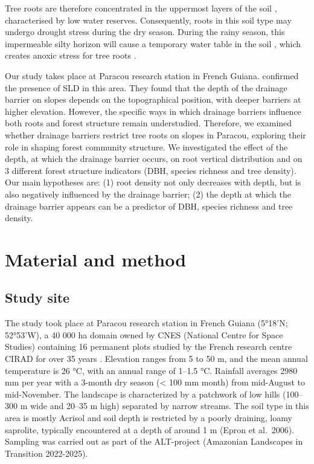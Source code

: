 \documentclass[fleqn,12pt]{latex/stylish_article} %
\begin{document}
Tree roots are therefore concentrated in the uppermost layers of the soil \citep{humbelCaracterisationParMesures1978}, characterised by low water reserves. Consequently, roots in this soil type may undergo drought stress during the dry season. During the rainy season, this impermeable silty horizon will cause a temporary water table in the soil \citep{humbelCaracterisationParMesures1978, pelissierWithinplotRelationshipsTree2002}, which creates anoxic stress for tree roots \citep{sabatierInfluenceSoilCover1997}.

Our study takes place at Paracou research station in French Guiana. \citet{epronSpatialVariationSoil2006} confirmed the presence of SLD in this area. They found that the depth of the drainage barrier on slopes depends on the topographical position, with deeper barriers at higher elevation. However, the specific ways in which drainage barriers influence both roots and forest structure remain understudied. Therefore, we examined whether drainage barriers restrict tree roots on slopes in Paracou, exploring their role in shaping forest community structure. We investigated the effect of the depth, at which the drainage barrier occurs, on root vertical distribution and on 3 different forest structure indicators (DBH, species richness and tree density). Our main hypotheses are: (1) root density not only decreases with depth, but is also negatively influenced by the drainage barrier; (2) the depth at which the drainage barrier appears can be a predictor of DBH, species richness and tree density.

\hypertarget{material-and-method}{%
\section{Material and method}\label{material-and-method}}

\hypertarget{study-site}{%
\subsection{Study site}\label{study-site}}

The study took place at Paracou research station in French Guiana (5°18'N; 52°53'W), a 40 000 ha domain owned by CNES (National Centre for Space Studies) containing 16 permanent plots studied by the French research centre CIRAD for over 35 years . Elevation ranges from 5 to 50 m, and the mean annual temperature is 26 °C, with an annual range of 1--1.5 °C. Rainfall averages 2980 mm per year with a 3-month dry season (\textless{} 100 mm month) from mid-August to mid-November. The landscape is characterized by a patchwork of low hills (100--300 m wide and 20--35 m high) separated by narrow streams. The soil type in this area is mostly Acrisol and soil depth is restricted by a poorly draining, loamy saprolite, typically encountered at a depth of around 1 m (Epron et al.~2006).
Sampling was carried out as part of the ALT-project (Amazonian Landscapes in Transition 2022-2025).
\end{document}
